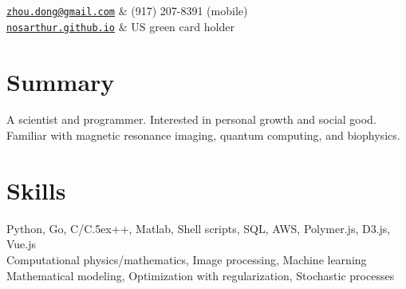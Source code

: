 \documentclass[centered,11pt,overlapped]{res}
\def\Cplusplus{{\rm C\raise.5ex\hbox{\small ++}}}
\begin{document}


\begin{resume}

\begin{ncolumn}{2}
   {\tt \href{mailto:zhou.dong@gmail.com}{zhou.dong@gmail.com}} &  (917) 207-8391 (mobile) \\
   {\tt \href{http://nosarthur.github.io}{nosarthur.github.io}} &  US green card holder
\end{ncolumn}


\section{\sc Summary}
A scientist and programmer. 
Interested in personal growth and social good.
Familiar with magnetic resonance imaging, quantum computing, and biophysics.



\section{\sc Skills}
Python, Go, C/\Cplusplus, Matlab, Shell scripts, SQL, AWS, Polymer.js, D3.js, Vue.js\\
Computational physics/mathematics, Image processing, Machine learning\\
Mathematical modeling, Optimization with regularization, Stochastic processes 



\end{resume}
\end{document}
